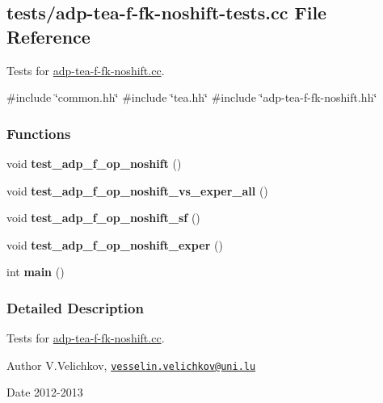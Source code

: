 \hypertarget{adp-tea-f-fk-noshift-tests_8cc}{\subsection{tests/adp-\/tea-\/f-\/fk-\/noshift-\/tests.cc \-File \-Reference}
\label{adp-tea-f-fk-noshift-tests_8cc}
}


\-Tests for \hyperlink{adp-tea-f-fk-noshift_8cc}{adp-\/tea-\/f-\/fk-\/noshift.\-cc}.  


{\ttfamily \#include \char`\"{}common.\-hh\char`\"{}}\*
{\ttfamily \#include \char`\"{}tea.\-hh\char`\"{}}\*
{\ttfamily \#include \char`\"{}adp-\/tea-\/f-\/fk-\/noshift.\-hh\char`\"{}}\*
\subsubsection*{\-Functions}
\begin{DoxyCompactItemize}
\item 
\hypertarget{adp-tea-f-fk-noshift-tests_8cc_a184056482b8ec37eae664ea70b176cab}{void {\bfseries test\-\_\-adp\-\_\-f\-\_\-op\-\_\-noshift} ()}\label{adp-tea-f-fk-noshift-tests_8cc_a184056482b8ec37eae664ea70b176cab}

\item 
\hypertarget{adp-tea-f-fk-noshift-tests_8cc_a72bc653424d291406d58285be618dd3d}{void {\bfseries test\-\_\-adp\-\_\-f\-\_\-op\-\_\-noshift\-\_\-vs\-\_\-exper\-\_\-all} ()}\label{adp-tea-f-fk-noshift-tests_8cc_a72bc653424d291406d58285be618dd3d}

\item 
\hypertarget{adp-tea-f-fk-noshift-tests_8cc_a4781089a99ef7a1104e37a52c854c3d2}{void {\bfseries test\-\_\-adp\-\_\-f\-\_\-op\-\_\-noshift\-\_\-sf} ()}\label{adp-tea-f-fk-noshift-tests_8cc_a4781089a99ef7a1104e37a52c854c3d2}

\item 
\hypertarget{adp-tea-f-fk-noshift-tests_8cc_a754502689aede65e57b5077ce9cc16d4}{void {\bfseries test\-\_\-adp\-\_\-f\-\_\-op\-\_\-noshift\-\_\-exper} ()}\label{adp-tea-f-fk-noshift-tests_8cc_a754502689aede65e57b5077ce9cc16d4}

\item 
\hypertarget{adp-tea-f-fk-noshift-tests_8cc_ae66f6b31b5ad750f1fe042a706a4e3d4}{int {\bfseries main} ()}\label{adp-tea-f-fk-noshift-tests_8cc_ae66f6b31b5ad750f1fe042a706a4e3d4}

\end{DoxyCompactItemize}


\subsubsection{\-Detailed \-Description}
\-Tests for \hyperlink{adp-tea-f-fk-noshift_8cc}{adp-\/tea-\/f-\/fk-\/noshift.\-cc}. \begin{DoxyAuthor}{\-Author}
\-V.\-Velichkov, \href{mailto:vesselin.velichkov@uni.lu}{\tt vesselin.\-velichkov@uni.\-lu} 
\end{DoxyAuthor}
\begin{DoxyDate}{\-Date}
2012-\/2013 
\end{DoxyDate}
